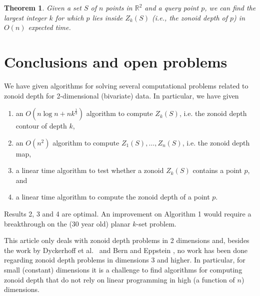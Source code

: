\documentclass{elsart}
\newtheorem{theorem}{Theorem}
\begin{document}
\begin{theorem}\label{theorem_final}
Given a set $S$ of $n$ points in $\mathbb{R}^2$ and a query point $p$,
we can find the largest integer $k$ for which $p$ lies inside $Z_k(S)$
(i.e., the zonoid depth of $p$) in $O(n)$ expected time. 
\end{theorem}

\section{Conclusions and open problems}\label{section_conclusions_and_open_problems}

We have given algorithms for solving several computational problems
related to zonoid depth for 2-dimensional (bivariate) data.
In particular,  we have given 

\begin{enumerate}
\item an $O(n\log n+nk^{\frac{1}{3}})$ algorithm to compute $Z_k(S)$, i.e. the zonoid depth contour of depth $k$,	
\item an $O(n^2)$ algorithm to compute $Z_1(S),\ldots,Z_n(S)$, i.e. the zonoid depth map,
\item a linear time algorithm to test whether a zonoid $Z_k(S)$
contains a point $p$, and
\item a linear time algorithm to compute the zonoid depth of a point $p$.
\end{enumerate}
Results 2, 3 and 4 are optimal. An improvement on Algorithm 1 would require a breakthrough on the (30 year old) planar $k$-set problem. 

This article only deals with zonoid depth problems in 2 dimensions
and, besides the work by Dyckerhoff et al.\
\cite{zonoid_data_depth_theory_and_computation} and Bern and Eppstein
\cite{bern-eppstein-01}, no work has been done regarding zonoid depth
problems in dimensions 3 and higher.  In particular, for small
(constant)
dimensions it is a challenge to find algorithms for computing zonoid
depth that do not rely on linear programming in high (a function of
$n$) dimensions.



\end{document}
